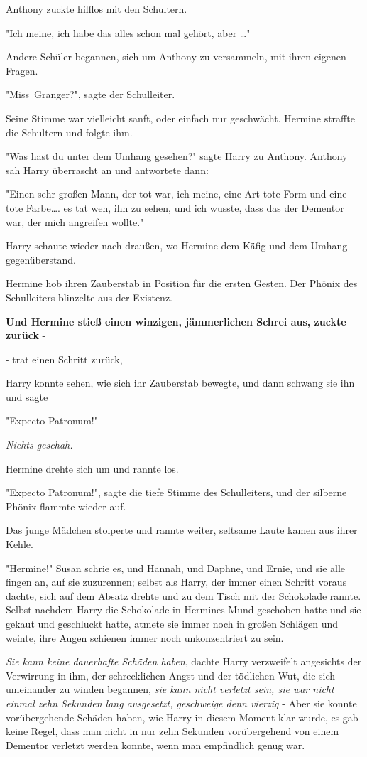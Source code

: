 {Anthony zuckte hilflos mit den Schultern.

"Ich meine, ich habe das alles schon mal gehört, aber …"

Andere Schüler begannen, sich um Anthony zu versammeln, mit ihren eigenen Fragen.

"Miss~Granger?", sagte der Schulleiter.

Seine Stimme war vielleicht sanft, oder einfach nur geschwächt. Hermine straffte die Schultern und folgte ihm.

"Was hast du unter dem Umhang gesehen?" sagte Harry zu Anthony. Anthony sah Harry überrascht an und antwortete dann:

"Einen sehr großen Mann, der tot war, ich meine, eine Art tote Form und eine tote Farbe…. es tat weh, ihn zu sehen, und ich wusste, dass das der Dementor war, der mich angreifen wollte."

Harry schaute wieder nach draußen, wo Hermine dem Käfig und dem Umhang gegenüberstand.

Hermine hob ihren Zauberstab in Position für die ersten Gesten. Der Phönix des Schulleiters blinzelte aus der Existenz.

\textbf{Und Hermine stieß einen winzigen, jämmerlichen Schrei aus, zuckte zurück} -

- trat einen Schritt zurück,

Harry konnte sehen, wie sich ihr Zauberstab bewegte, und dann schwang sie ihn und sagte

"Expecto Patronum!"

\emph{Nichts geschah.}

Hermine drehte sich um und rannte los.

"Expecto Patronum!", sagte die tiefe Stimme des Schulleiters, und der silberne Phönix flammte wieder auf.

Das junge Mädchen stolperte und rannte weiter, seltsame Laute kamen aus ihrer Kehle.

"Hermine!" Susan schrie es, und Hannah, und Daphne, und Ernie, und sie alle fingen an, auf sie zuzurennen; selbst als Harry, der immer einen Schritt voraus dachte, sich auf dem Absatz drehte und zu dem Tisch mit der Schokolade rannte. Selbst nachdem Harry die Schokolade in Hermines Mund geschoben hatte und sie gekaut und geschluckt hatte, atmete sie immer noch in großen Schlägen und weinte, ihre Augen schienen immer noch unkonzentriert zu sein.

\emph{Sie kann keine dauerhafte Schäden haben}, dachte Harry verzweifelt angesichts der Verwirrung in ihm, der schrecklichen Angst und der tödlichen Wut, die sich umeinander zu winden begannen, \emph{sie kann nicht verletzt sein, sie war nicht einmal zehn Sekunden lang ausgesetzt, geschweige denn vierzig} - Aber sie konnte vorübergehende Schäden haben, wie Harry in diesem Moment klar wurde, es gab keine Regel, dass man nicht in nur zehn Sekunden vorübergehend von einem Dementor verletzt werden konnte, wenn man empfindlich genug war.

}
